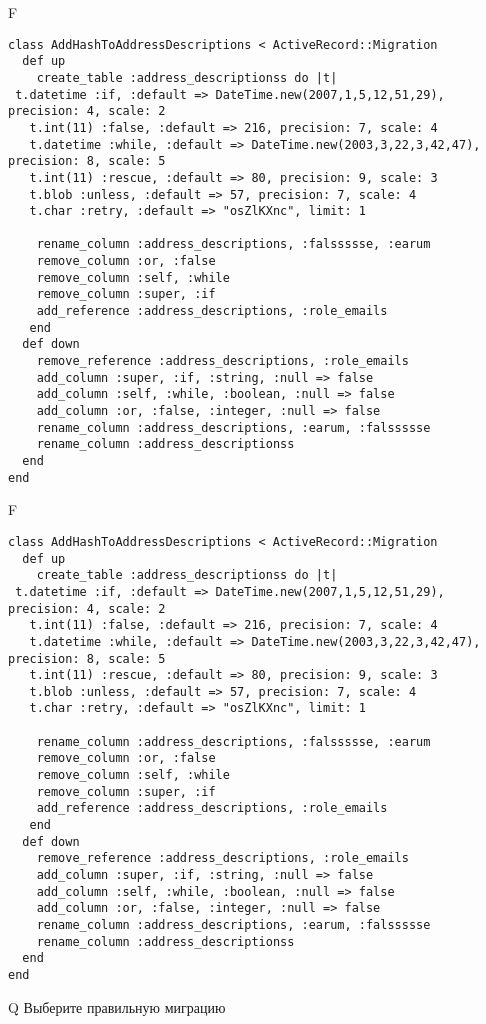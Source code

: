 F
\begin{verbatim}
class AddHashToAddressDescriptions < ActiveRecord::Migration
  def up
    create_table :address_descriptionss do |t| 
 t.datetime :if, :default => DateTime.new(2007,1,5,12,51,29), precision: 4, scale: 2
   t.int(11) :false, :default => 216, precision: 7, scale: 4
   t.datetime :while, :default => DateTime.new(2003,3,22,3,42,47), precision: 8, scale: 5
   t.int(11) :rescue, :default => 80, precision: 9, scale: 3
   t.blob :unless, :default => 57, precision: 7, scale: 4
   t.char :retry, :default => "osZlKXnc", limit: 1

    rename_column :address_descriptions, :falssssse, :earum
    remove_column :or, :false
    remove_column :self, :while
    remove_column :super, :if
    add_reference :address_descriptions, :role_emails
   end
  def down
    remove_reference :address_descriptions, :role_emails
    add_column :super, :if, :string, :null => false
    add_column :self, :while, :boolean, :null => false
    add_column :or, :false, :integer, :null => false
    rename_column :address_descriptions, :earum, :falssssse
    rename_column :address_descriptionss
  end
end
\end{verbatim}

F
\begin{verbatim}
class AddHashToAddressDescriptions < ActiveRecord::Migration
  def up
    create_table :address_descriptionss do |t| 
 t.datetime :if, :default => DateTime.new(2007,1,5,12,51,29), precision: 4, scale: 2
   t.int(11) :false, :default => 216, precision: 7, scale: 4
   t.datetime :while, :default => DateTime.new(2003,3,22,3,42,47), precision: 8, scale: 5
   t.int(11) :rescue, :default => 80, precision: 9, scale: 3
   t.blob :unless, :default => 57, precision: 7, scale: 4
   t.char :retry, :default => "osZlKXnc", limit: 1

    rename_column :address_descriptions, :falssssse, :earum
    remove_column :or, :false
    remove_column :self, :while
    remove_column :super, :if
    add_reference :address_descriptions, :role_emails
   end
  def down
    remove_reference :address_descriptions, :role_emails
    add_column :super, :if, :string, :null => false
    add_column :self, :while, :boolean, :null => false
    add_column :or, :false, :integer, :null => false
    rename_column :address_descriptions, :earum, :falssssse
    rename_column :address_descriptionss
  end
end
\end{verbatim}
Q
Выберите правильную миграцию

